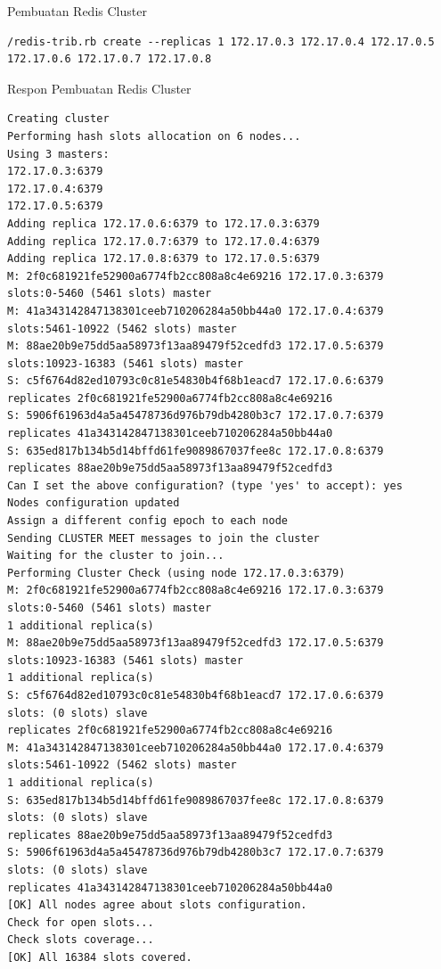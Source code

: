 \begin{listing}[!]
	\captionsetup{format=hang}
	\caption{Pembuatan Redis Cluster}
	\label{lst:redis_trib_cluster}
	\begin{verbatim}
/redis-trib.rb create --replicas 1 172.17.0.3 172.17.0.4 172.17.0.5 172.17.0.6 172.17.0.7 172.17.0.8
	\end{verbatim}
\end{listing}


\begin{listing}[!]
	\captionsetup{format=hang}
	\caption{Respon Pembuatan Redis Cluster}
	\label{lst:redis_trib_cluster_response}
	\begin{verbatim}
Creating cluster
Performing hash slots allocation on 6 nodes...
Using 3 masters:
172.17.0.3:6379
172.17.0.4:6379
172.17.0.5:6379
Adding replica 172.17.0.6:6379 to 172.17.0.3:6379
Adding replica 172.17.0.7:6379 to 172.17.0.4:6379
Adding replica 172.17.0.8:6379 to 172.17.0.5:6379
M: 2f0c681921fe52900a6774fb2cc808a8c4e69216 172.17.0.3:6379
slots:0-5460 (5461 slots) master
M: 41a343142847138301ceeb710206284a50bb44a0 172.17.0.4:6379
slots:5461-10922 (5462 slots) master
M: 88ae20b9e75dd5aa58973f13aa89479f52cedfd3 172.17.0.5:6379
slots:10923-16383 (5461 slots) master
S: c5f6764d82ed10793c0c81e54830b4f68b1eacd7 172.17.0.6:6379
replicates 2f0c681921fe52900a6774fb2cc808a8c4e69216
S: 5906f61963d4a5a45478736d976b79db4280b3c7 172.17.0.7:6379
replicates 41a343142847138301ceeb710206284a50bb44a0
S: 635ed817b134b5d14bffd61fe9089867037fee8c 172.17.0.8:6379
replicates 88ae20b9e75dd5aa58973f13aa89479f52cedfd3
Can I set the above configuration? (type 'yes' to accept): yes
Nodes configuration updated
Assign a different config epoch to each node
Sending CLUSTER MEET messages to join the cluster
Waiting for the cluster to join...
Performing Cluster Check (using node 172.17.0.3:6379)
M: 2f0c681921fe52900a6774fb2cc808a8c4e69216 172.17.0.3:6379
slots:0-5460 (5461 slots) master
1 additional replica(s)
M: 88ae20b9e75dd5aa58973f13aa89479f52cedfd3 172.17.0.5:6379
slots:10923-16383 (5461 slots) master
1 additional replica(s)
S: c5f6764d82ed10793c0c81e54830b4f68b1eacd7 172.17.0.6:6379
slots: (0 slots) slave
replicates 2f0c681921fe52900a6774fb2cc808a8c4e69216
M: 41a343142847138301ceeb710206284a50bb44a0 172.17.0.4:6379
slots:5461-10922 (5462 slots) master
1 additional replica(s)
S: 635ed817b134b5d14bffd61fe9089867037fee8c 172.17.0.8:6379
slots: (0 slots) slave
replicates 88ae20b9e75dd5aa58973f13aa89479f52cedfd3
S: 5906f61963d4a5a45478736d976b79db4280b3c7 172.17.0.7:6379
slots: (0 slots) slave
replicates 41a343142847138301ceeb710206284a50bb44a0
[OK] All nodes agree about slots configuration.
Check for open slots...
Check slots coverage...
[OK] All 16384 slots covered.
	\end{verbatim}
\end{listing}


